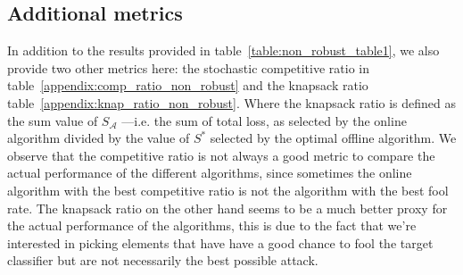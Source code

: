 \subsection{Additional metrics}
In addition to the results provided in table~\ref{table:non_robust_table1}, we also provide two other metrics here: the stochastic competitive ratio in table~\ref{appendix:comp_ratio_non_robust} and the knapsack ratio table~\ref{appendix:knap_ratio_non_robust}. Where the knapsack ratio is defined as the sum value of $S_{\mathcal{A}}$ ---i.e. the sum of total loss, as selected by the online algorithm divided by the value of $S^*$ selected by the optimal offline algorithm.
We observe that the competitive ratio is not always a good metric to compare the actual performance of the different algorithms, since sometimes the online algorithm with the best competitive ratio is not the algorithm with the best fool rate. The knapsack ratio on the other hand seems to be a much better proxy for the actual performance of the algorithms, this is due to the fact that we're interested in picking elements that have have a good chance to fool the target classifier but are not necessarily the best possible attack.

